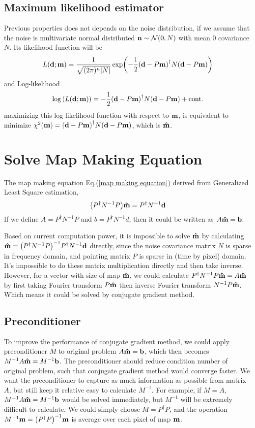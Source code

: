 \documentclass[11pt, letterpaper]{article}
\newcommand{\vbd}{\vb{d}}
\newcommand{\vbm}{\vb{m}}
\newcommand{\vbn}{\vb{n}}
\newcommand{\vbb}{\vb{b}}
\newcommand{\inv}[1]{#1^{-1}}
\newcommand{\hatm}{\vb{\hat{m}}}
\newcommand{\Pdagger}{P^{\dagger}}
\newcommand{\PPinv}[1]{\inv{\qty(\Pdagger #1 P)}}
\begin{document}
\subsection{Maximum likelihood estimator}
Previous properties does not depends on the noise distribution, 
if we assume that the noise is multivariate normal distributed
$\vbn \sim \mathcal{N}(0, N)$ with mean $0$ covariance $N$.
Its likelihood function will be
\begin{align}
L\qty(\vbd;\vbm) = \frac{1}{\sqrt{(2\pi)^n \abs{N}}} 
    \exp(-\frac{1}{2} \qty(\vbd - P\vbm)^{\dagger} N \qty(\vbd - P\vbm))
\end{align}
and Log-likelihood
\begin{align}
\log\qty(L\qty(\vbd;\vbm))
= -\frac{1}{2} \qty(\vbd - P\vbm)^{\dagger} N \qty(\vbd - P\vbm) + \text{cont.}  
\end{align}
maximizing this log-likelihood function with respect to $\vbm$, is equivalent
to minimize $\chi^2(\vbm) =\qty(\vbd - P\vbm)^{\dagger} N \qty(\vbd - P\vbm)$,
which is $\hatm$.

\section{Solve Map Making Equation}

The map making equation Eq.(\ref{map making equation}) derived from Generalized
Least Square estimation,
\begin{align}
\qty(\Pdagger \inv{N}  P) \hatm = \Pdagger \inv{N} \vbd \label{map making eq}
\end{align}
If we define $A = \Pdagger \inv{N} P$ and $b = \Pdagger \inv{N} d$,
then it could be written as $A\hatm = \vbb$.

Based on current computation power, it is impossible to solve $\hatm$
by calculating $\hatm = \PPinv{\inv{N}} \Pdagger \inv{N} \vbd$ directly,
since the noise covariance matrix $N$ is sparse in frequency domain,
and pointing matrix $P$ is sparse in (time by pixel) domain.
It's impossible to do these matrix multiplication directly and then take
inverse.
However, for a vector with size of map $\hatm$, we could calculate
$\Pdagger \inv{N} P \hatm = A\hatm$ by first taking Fourier transform $P\hatm$
then inverse Fourier transform $\inv{N}P\hatm$.
Which means it could be solved by conjugate gradient method.


\subsection{Preconditioner}
To improve the performance of conjugate gradient method,
we could apply preconditioner $M$ to original problem $A\hatm = \vbb$,
which then becomes $\inv{M}A\hatm = \inv{M} \vbb$.
The preconditioner should reduce condition number of original problem,
such that conjugate gradient method would converge faster.
We want the preconditioner to capture as much information as possible from 
matrix $A$, but still keep it relative easy to calculate $\inv{M}$.
For example, if $M = A$, $\inv{M} A \hatm = \inv{M} \vbb$ would be solved
immediately, but $\inv{M}$ will be extremely difficult to calculate.
We could simply choose $M = \Pdagger P$,
and the operation $\inv{M} \vbm = \PPinv{} \vbm$ is average over each pixel 
of map $\vbm$.
\end{document}
